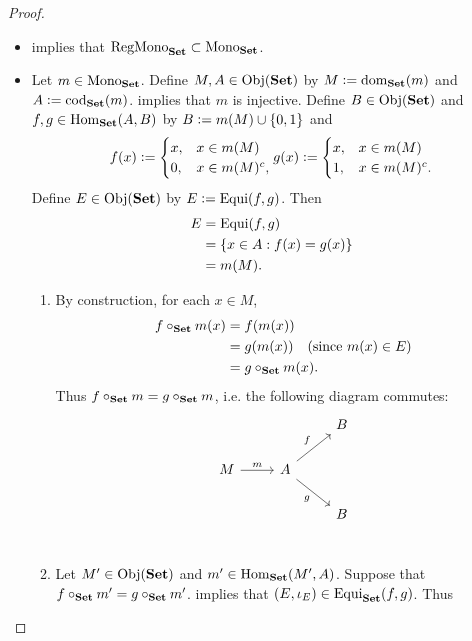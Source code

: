 \documentclass{book}
\begin{document}
	\begin{proof}\
		\begin{itemize}
			\item {} implies that $\operatorname{RegMono}_{\text{\textbf{Set}}} \subset \operatorname{Mono}_{\text{\textbf{Set}}}$.
			\item Let $m \in \operatorname{Mono}_{\text{\textbf{Set}}}$. Define $M, A \in \operatorname{Obj}(\text{\textbf{Set}})$ by $M \vcentcolon= \operatorname{dom}_{\text{\textbf{Set}}}(m)$ and $A \vcentcolon= \operatorname{cod}_{\text{\textbf{Set}}}(m)$.  implies that $m$ is injective. Define $B \in \operatorname{Obj}(\text{\textbf{Set}})$ and $f,g \in \operatorname{Hom}_{\text{\textbf{Set}}}(A,B)$ by $B \vcentcolon= m(M) \cup \{0,1\}$ and
			\[
			f(x) \vcentcolon= 
			\begin{cases}
				x, & x \in m(M) \\
				0, & x \in m(M)^c,
			\end{cases}
			g(x) \vcentcolon= 
			\begin{cases}
				x, & x \in m(M) \\
				1, & x \in m(M)^c.
			\end{cases}
			\]
			Define $E \in \operatorname{Obj}(\text{\textbf{Set}})$ by $E \vcentcolon= \operatorname{Equi}(f,g)$. Then 
			\begin{align*}
				E
				& = \operatorname{Equi}(f,g) \\
				& = \{x \in A: f(x) = g(x)\} \\
				& = m(M).
			\end{align*}
			\begin{enumerate}
				\item By construction, for each $x \in M$, 
				\begin{align*}
					f \circ_{\text{\textbf{Set}}} m(x)
					& = f(m(x)) \\
					& = g(m(x)) \quad \text{(since $m(x) \in E$)} \\
					& = g \circ_{\text{\textbf{Set}}} m(x).
				\end{align*}
				Thus $f \circ_{\text{\textbf{Set}}} m = g \circ_{\text{\textbf{Set}}} m$, i.e. the following diagram commutes: 
				\[ 
				\begin{tikzcd}[baseline= 7]
					&                                   & B \\
					M \arrow[r, "m"]  & A \arrow[ur, "f"] \arrow[dr, "g"'] &   \\
					&                                   & B \\
				\end{tikzcd}
				\]
				\item Let $M' \in \operatorname{Obj}(\text{\textbf{Set}})$ and $m' \in \operatorname{Hom}_{\text{\textbf{Set}}}(M', A)$. Suppose that $f \circ_{\text{\textbf{Set}}} m' = g \circ_{\text{\textbf{Set}}} m'$. \rex{}  implies that $(E, \iota_E) \in \operatorname{Equi}_{\text{\textbf{Set}}}(f,g)$. Thus 
				\begin{itemize}

\end{itemize}
\end{enumerate}
\end{itemize}
\end{proof}
\end{document}
